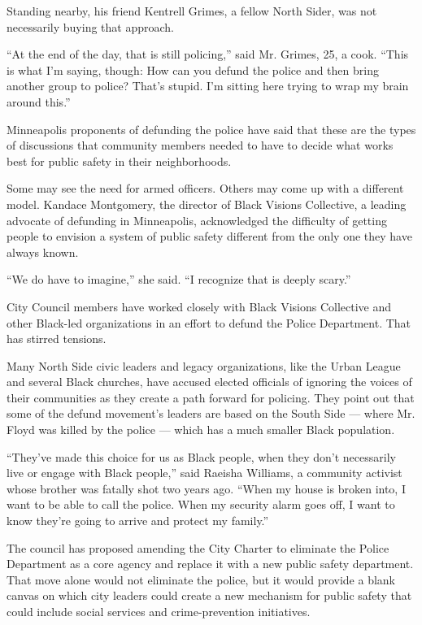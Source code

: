 Standing nearby, his friend Kentrell Grimes, a fellow North Sider, was
not necessarily buying that approach.

``At the end of the day, that is still policing,'' said Mr. Grimes, 25,
a cook. ``This is what I'm saying, though: How can you defund the police
and then bring another group to police? That's stupid. I'm sitting here
trying to wrap my brain around this.''

Minneapolis proponents of defunding the police have said that these are
the types of discussions that community members needed to have to decide
what works best for public safety in their neighborhoods.

Some may see the need for armed officers. Others may come up with a
different model. Kandace Montgomery, the director of Black Visions
Collective, a leading advocate of defunding in Minneapolis, acknowledged
the difficulty of getting people to envision a system of public safety
different from the only one they have always known.

``We do have to imagine,'' she said. ``I recognize that is deeply
scary.''

City Council members have worked closely with Black Visions Collective
and other Black-led organizations in an effort to defund the Police
Department. That has stirred tensions.

Many North Side civic leaders and legacy organizations, like the Urban
League and several Black churches, have accused elected officials of
ignoring the voices of their communities as they create a path forward
for policing. They point out that some of the defund movement's leaders
are based on the South Side --- where Mr. Floyd was killed by the police
--- which has a much smaller Black population.

``They've made this choice for us as Black people, when they don't
necessarily live or engage with Black people,'' said Raeisha Williams, a
community activist whose brother was fatally shot two years ago. ``When
my house is broken into, I want to be able to call the police. When my
security alarm goes off, I want to know they're going to arrive and
protect my family.''

The council has proposed amending the City Charter to eliminate the
Police Department as a core agency and replace it with a new public
safety department. That move alone would not eliminate the police, but
it would provide a blank canvas on which city leaders could create a new
mechanism for public safety that could include social services and
crime-prevention initiatives.

